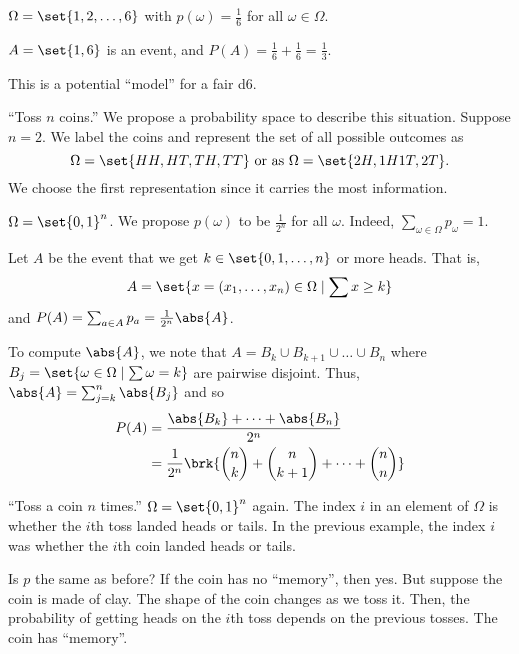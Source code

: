\begin{examples}
    \item $\Omega = \set{1, 2, \dots, 6}$ with $p(\omega) = \frac{1}{6}$ for all
        $\omega \in \Omega$.

        $A = \set{1, 6}$ is an event, and
        $P(A) = \frac{1}{6} + \frac{1}{6} = \frac{1}{3}$.

        This is a potential ``model'' for a fair d6.
    \item ``Toss $n$ coins.''
        We propose a probability space to describe this situation.
        Suppose $n = 2$.
        We label the coins and represent the set of all possible outcomes as \[
            \Omega = \set{HH, HT, TH, TT} \text{ or as }
            \Omega = \set{2H, 1H1T, 2T}.
        \]
        We choose the first representation since it carries the most
        information.

        $\Omega = \set{0, 1}^{n}$.
        We propose $p(\omega)$ to be $\frac{1}{2^{n}}$ for all $\omega$.
        Indeed, $\sum_{\omega \in \Omega} p_{\omega} = 1$.

        Let $A$ be the event that we get $k \in \set{0, 1, \dots, n}$ or more
        heads.
        That is, \[
            A = \set{x = (x_{1}, \dots, x_{n}) \in \Omega \mid \sum x \geq k}
        \] and $P(A) = \sum_{a \in A} p_{a} = \frac{1}{2^{n}} \abs{A}$.
        
        To compute $\abs{A}$, we note that $A = B_{k} \cup B_{k+1} \cup \dots
        \cup B_{n}$ where $B_{j} =
        \set{\omega \in \Omega \mid \sum \omega = k}$ are pairwise disjoint.
        Thus, $\abs{A} = \sum_{j = k}^{n} \abs{B_{j}}$ and so
        \begin{align*}
            P(A) &= \frac{\abs{B_{k}} + \dots + \abs{B_{n}}}{2^{n}} \\
                &= \frac{1}{2^{n}} \brk{
                    \binom{n}{k} + \binom{n}{k+1} + \dots + \binom{n}{n}
                }
        \end{align*}
    \item ``Toss a coin $n$ times.''
        $\Omega = \set{0, 1}^{n}$ again.
        The index $i$ in an element of $\Omega$ is whether the $i$th toss landed
        heads or tails.
        In the previous example, the index $i$ was whether the $i$th coin
        landed heads or tails.

        Is $p$ the same as before?
        If the coin has no ``memory'', then yes.
        But suppose the coin is made of clay.
        The shape of the coin changes as we toss it.
        Then, the probability of getting heads on the $i$th toss depends on
        the previous tosses.
        The coin has ``memory''.
        

\end{examples}
